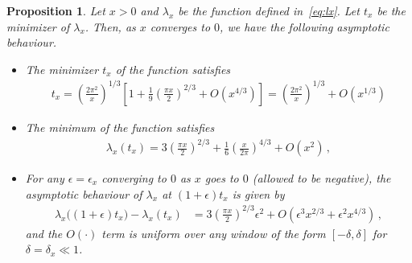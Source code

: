 \documentclass{article}
\newcommand{\1}{\mathbbm{1}}								%
\newtheorem{proposition}[theorem]{Proposition}
\theoremstyle{definition}
\numberwithin{equation}{section}
\newcommand{\numitem}[1]{$\mathbf{(#1)}$}
\begin{document}
\begin{proposition}\label{prop:asympt lx}
    Let $x>0$ and $\lambda_x$ be the function defined in~\eqref{eq:lx}.
    Let $t_x$ be the minimizer of $\lambda_x$.
    Then, as $x$ converges to $0$, we have the following asymptotic behaviour.
    \begin{itemize}
        \item[\numitem{1}] The minimizer $t_x$ of the function satisfies
        \begin{align*}
            t_x=\left(\frac{2\pi^2}{x}\right)^{1/3}\left[1+\frac{1}{9}\left(\frac{\pi x}{2}\right)^{2/3}+O\left(x^{4/3}\right)\right]=\left(\frac{2\pi^2}{x}\right)^{1/3}+O\left(x^{1/3}\right)
        \end{align*}
        \item[\numitem{2}] The minimum of the function satisfies
        \begin{align*}
            \lambda_x(t_x)=3\left(\frac{\pi x}{2}\right)^{2/3}+\frac{1}{6}\left(\frac{x}{2\pi}\right)^{4/3}+O\left(x^2\right)\,,
        \end{align*}
        \item[\numitem{3}] For any $\epsilon=\epsilon_x$ converging to $0$ as $x$ goes to $0$ (allowed to be negative), the asymptotic behaviour of $\lambda_x$ at $(1+\epsilon)t_x$ is given by
        \begin{align*}
            \lambda_x\big((1+\epsilon)t_x\big)-\lambda_x(t_x)&=3\left(\frac{\pi x}{2}\right)^{2/3}\epsilon^2+O\left(\epsilon^3x^{2/3}+\epsilon^2x^{4/3}\right)\,,
        \end{align*}
        and the $O(\cdot)$ term is uniform over any window of the form $[-\delta,\delta]$ for $\delta=\delta_x\ll1$.
    \end{itemize}
\end{proposition}
\end{document}
